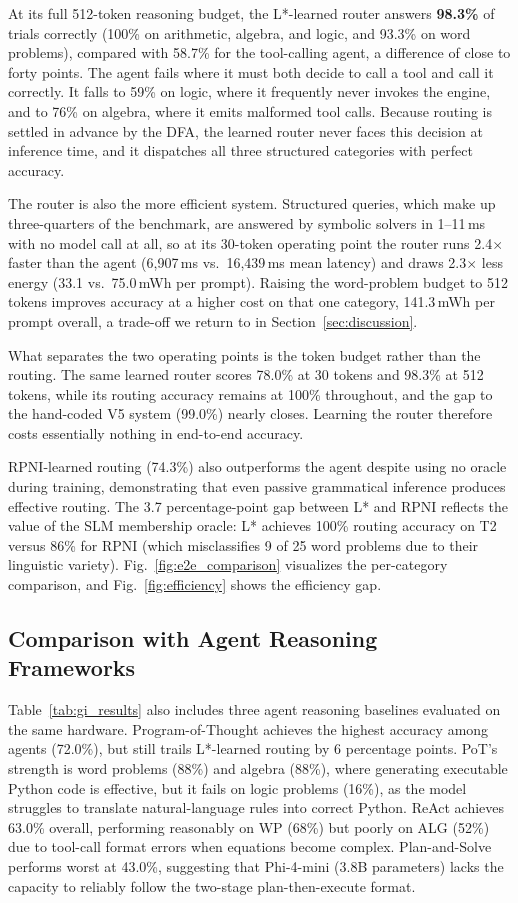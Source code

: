 \documentclass[journal]{IEEEtai}
\begin{document}
At its full 512-token reasoning budget, the L*-learned router answers \textbf{98.3\%} of trials correctly (100\% on arithmetic, algebra, and logic, and 93.3\% on word problems), compared with 58.7\% for the tool-calling agent, a difference of close to forty points. The agent fails where it must both decide to call a tool and call it correctly. It falls to 59\% on logic, where it frequently never invokes the engine, and to 76\% on algebra, where it emits malformed tool calls. Because routing is settled in advance by the DFA, the learned router never faces this decision at inference time, and it dispatches all three structured categories with perfect accuracy.

The router is also the more efficient system. Structured queries, which make up three-quarters of the benchmark, are answered by symbolic solvers in 1--11\,ms with no model call at all, so at its 30-token operating point the router runs 2.4$\times$ faster than the agent (6{,}907\,ms vs.\ 16{,}439\,ms mean latency) and draws 2.3$\times$ less energy (33.1 vs.\ 75.0\,mWh per prompt). Raising the word-problem budget to 512 tokens improves accuracy at a higher cost on that one category, 141.3\,mWh per prompt overall, a trade-off we return to in Section~\ref{sec:discussion}.

What separates the two operating points is the token budget rather than the routing. The same learned router scores 78.0\% at 30 tokens and 98.3\% at 512 tokens, while its routing accuracy remains at 100\% throughout, and the gap to the hand-coded V5 system (99.0\%) nearly closes. Learning the router therefore costs essentially nothing in end-to-end accuracy.

RPNI-learned routing (74.3\%) also outperforms the agent despite using no oracle during training, demonstrating that even passive grammatical inference produces effective routing. The 3.7 percentage-point gap between L* and RPNI reflects the value of the SLM membership oracle: L* achieves 100\% routing accuracy on T2 versus 86\% for RPNI (which misclassifies 9 of 25 word problems due to their linguistic variety). Fig.~\ref{fig:e2e_comparison} visualizes the per-category comparison, and Fig.~\ref{fig:efficiency} shows the efficiency gap.

\subsection{Comparison with Agent Reasoning Frameworks}

Table~\ref{tab:gi_results} also includes three agent reasoning baselines evaluated on the same hardware. Program-of-Thought achieves the highest accuracy among agents (72.0\%), but still trails L*-learned routing by 6 percentage points. PoT's strength is word problems (88\%) and algebra (88\%), where generating executable Python code is effective, but it fails on logic problems (16\%), as the model struggles to translate natural-language rules into correct Python. ReAct achieves 63.0\% overall, performing reasonably on WP (68\%) but poorly on ALG (52\%) due to tool-call format errors when equations become complex. Plan-and-Solve performs worst at 43.0\%, suggesting that Phi-4-mini (3.8B parameters) lacks the capacity to reliably follow the two-stage plan-then-execute format.
\end{document}
